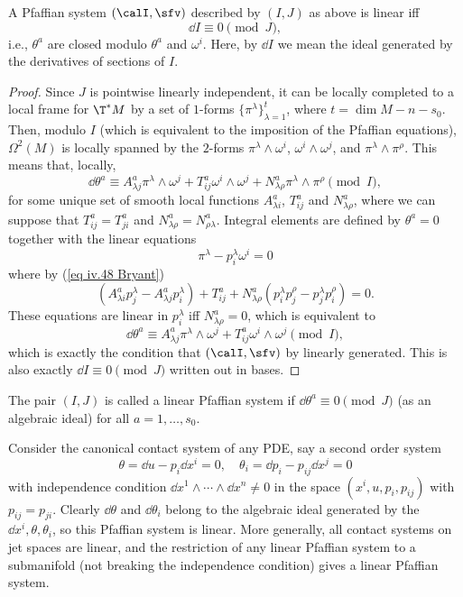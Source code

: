 \begin{prop}
    A Pfaffian system $(\calI,\sfv)$ described by $(I,J)$ as above is linear iff 
    \[\dd I\equiv 0\pmod{J},\]
    i.e., $\theta^a$ are closed modulo $\theta^a$ and $\omega^i$. Here, by $\dd I$ we mean the ideal generated by the derivatives of sections of $I$.
\end{prop}
\begin{proof}
    Since $J$ is pointwise linearly independent, it can be locally completed to a local frame for $\T^\ast M$ by a set of $1$-forms $\{\pi^\lambda\}_{\lambda=1}^t$, where $t=\dim M-n-s_0$. Then, modulo $I$ (which is equivalent to the imposition of the Pfaffian equations), $\Omega^2(M)$ is locally spanned by the $2$-forms $\pi^\lambda\wedge \omega^i$, $\omega^i\wedge\omega^j$, and $\pi^\lambda\wedge\pi^\rho$. This means that, locally,
    \[\dd\theta^a\equiv A^a_{\lambda j}\pi^\lambda\wedge\omega^j+T^a_{ij}\omega^i\wedge\omega^j +N^a_{\lambda\rho}\pi^\lambda\wedge\pi^\rho \pmod{I},\label{eq iv.48 Bryant}\]
    for some unique set of smooth local functions $A^a_{\lambda i}$, $T^a_{ij}$ and $N^a_{\lambda\rho}$, where we can suppose that $T^a_{ij}=T^a_{ji}$ and $N^a_{\lambda\rho}=N^a_{\rho\lambda}$. Integral elements are defined by $\theta^a=0$ together with the linear equations 
    \[\pi^\lambda-p^\lambda_i\omega^i=0\]
    where by (\ref{eq iv.48 Bryant})
    \[(A^a_{\lambda i}p^\lambda_j-A^a_{\lambda j}p^\lambda_i)+T^a_{ij}+N^a_{\lambda\rho}(p^\lambda_ip^\rho_j-p^\lambda_jp^\rho_i)=0.\label{eq iv.50 Bryant}\]
    These equations are linear in $p^\lambda_i$ iff $N^a_{\lambda\rho}=0$, which is equivalent to 
    \[\boxed{\dd\theta^a\equiv A^a_{\lambda j}\pi^\lambda\wedge\omega^j+T^a_{ij}\omega^i\wedge\omega^j \pmod{I},}\label{eq def tableau+torsion}\]
    which is exactly the condition that $(\calI,\sfv)$ by linearly generated. This is also exactly $\dd I\equiv 0\pmod{J}$ written out in bases.
\end{proof}


\begin{defn}
    The pair $(I,J)$ is called a linear Pfaffian system if $\dd \theta^a\equiv 0\pmod{J}$ (as an algebraic ideal) for all $a=1,\ldots,s_0$.
\end{defn}

\begin{example}
    Consider the canonical contact system of any PDE, say a second order system
    \[\theta=\dd u-p_i\dd x^i=0,\quad \theta_i=\dd p_i-p_{ij}\dd x^j=0\]
    with independence condition $\dd x^1\wedge\cdots\wedge\dd x^n\neq 0$ in the space $(x^i,u,p_i,p_{ij})$ with $p_{ij}=p_{ji}$. Clearly $\dd\theta$ and $\dd\theta_i$ belong to the algebraic ideal generated by the $\dd x^i,\theta,\theta_i$, so this Pfaffian system is linear. More generally, all contact systems on jet spaces are linear, and the restriction of any linear Pfaffian system to a submanifold (not breaking the independence condition) gives a linear Pfaffian system.
\end{example}



